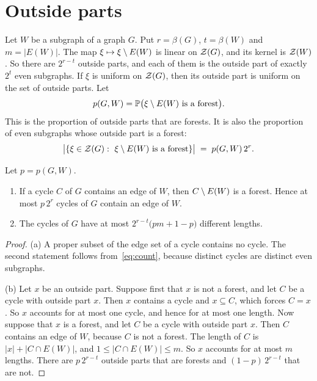 \section{Outside parts}\label{sec:count}

Let $W$ be a subgraph of a graph $G$. Put $r=\beta(G)$, $t=\beta(W)$ and $m=|E(W)|$. The map
$\xi\mapsto\xi\setminus E(W)$ is linear on $\mathcal{Z}(G)$, and its kernel is $\mathcal{Z}(W)$. So there are $2^{r-t}$
outside parts, and each of them is the outside part of exactly $2^{t}$ even subgraphs. If $\xi$ is
uniform on $\mathcal{Z}(G)$, then its outside part is uniform on the set of outside parts. Let
\[
  p(G,W)=\mathbb{P}\bigl(\xi\setminus E(W)\text{ is a forest}\bigr).
\]
This is the proportion of outside parts that are forests. It is also the proportion of even
subgraphs whose outside part is a forest:
\begin{equation}\label{eq:count}
  \bigl|\{\xi\in\mathcal{Z}(G):\ \xi\setminus E(W)\text{ is a forest}\}\bigr|\;=\;p(G,W)\,2^{r}.
\end{equation}

\begin{lemma}\label{lem:count}
Let $p=p(G,W)$.
\begin{enumerate}
\item[\textup{(a)}] If a cycle $C$ of $G$ contains an edge of $W$, then $C\setminus E(W)$ is a forest.
Hence at most $p\,2^{r}$ cycles of $G$ contain an edge of $W$.
\item[\textup{(b)}] The cycles of $G$ have at most $2^{r-t}\bigl(pm+1-p\bigr)$ different lengths.
\end{enumerate}
\end{lemma}

\begin{proof}
(a) A proper subset of the edge set of a cycle contains no cycle. The second statement follows
from~\eqref{eq:count}, because distinct cycles are distinct even subgraphs.

(b) Let $x$ be an outside part. Suppose first that $x$ is not a forest, and let $C$ be a cycle with
outside part $x$. Then $x$ contains a cycle and $x\subseteq C$, which forces $C=x$. So $x$ accounts
for at most one cycle, and hence for at most one length. Now suppose that $x$ is a forest, and let
$C$ be a cycle with outside part $x$. Then $C$ contains an edge of $W$, because $C$ is not a
forest. The length of $C$ is $|x|+|C\cap E(W)|$, and $1\le|C\cap E(W)|\le m$. So $x$ accounts for
at most $m$ lengths. There are $p\,2^{r-t}$ outside parts that are forests and $(1-p)\,2^{r-t}$
that are not.
\end{proof}

